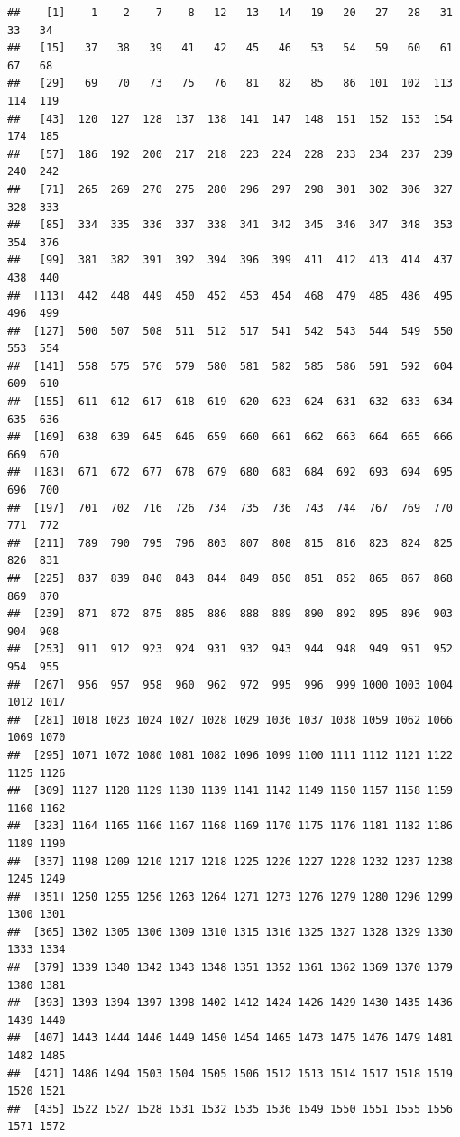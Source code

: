\documentclass[]{article}
\begin{document}
\begin{verbatim}
##    [1]    1    2    7    8   12   13   14   19   20   27   28   31   33   34
##   [15]   37   38   39   41   42   45   46   53   54   59   60   61   67   68
##   [29]   69   70   73   75   76   81   82   85   86  101  102  113  114  119
##   [43]  120  127  128  137  138  141  147  148  151  152  153  154  174  185
##   [57]  186  192  200  217  218  223  224  228  233  234  237  239  240  242
##   [71]  265  269  270  275  280  296  297  298  301  302  306  327  328  333
##   [85]  334  335  336  337  338  341  342  345  346  347  348  353  354  376
##   [99]  381  382  391  392  394  396  399  411  412  413  414  437  438  440
##  [113]  442  448  449  450  452  453  454  468  479  485  486  495  496  499
##  [127]  500  507  508  511  512  517  541  542  543  544  549  550  553  554
##  [141]  558  575  576  579  580  581  582  585  586  591  592  604  609  610
##  [155]  611  612  617  618  619  620  623  624  631  632  633  634  635  636
##  [169]  638  639  645  646  659  660  661  662  663  664  665  666  669  670
##  [183]  671  672  677  678  679  680  683  684  692  693  694  695  696  700
##  [197]  701  702  716  726  734  735  736  743  744  767  769  770  771  772
##  [211]  789  790  795  796  803  807  808  815  816  823  824  825  826  831
##  [225]  837  839  840  843  844  849  850  851  852  865  867  868  869  870
##  [239]  871  872  875  885  886  888  889  890  892  895  896  903  904  908
##  [253]  911  912  923  924  931  932  943  944  948  949  951  952  954  955
##  [267]  956  957  958  960  962  972  995  996  999 1000 1003 1004 1012 1017
##  [281] 1018 1023 1024 1027 1028 1029 1036 1037 1038 1059 1062 1066 1069 1070
##  [295] 1071 1072 1080 1081 1082 1096 1099 1100 1111 1112 1121 1122 1125 1126
##  [309] 1127 1128 1129 1130 1139 1141 1142 1149 1150 1157 1158 1159 1160 1162
##  [323] 1164 1165 1166 1167 1168 1169 1170 1175 1176 1181 1182 1186 1189 1190
##  [337] 1198 1209 1210 1217 1218 1225 1226 1227 1228 1232 1237 1238 1245 1249
##  [351] 1250 1255 1256 1263 1264 1271 1273 1276 1279 1280 1296 1299 1300 1301
##  [365] 1302 1305 1306 1309 1310 1315 1316 1325 1327 1328 1329 1330 1333 1334
##  [379] 1339 1340 1342 1343 1348 1351 1352 1361 1362 1369 1370 1379 1380 1381
##  [393] 1393 1394 1397 1398 1402 1412 1424 1426 1429 1430 1435 1436 1439 1440
##  [407] 1443 1444 1446 1449 1450 1454 1465 1473 1475 1476 1479 1481 1482 1485
##  [421] 1486 1494 1503 1504 1505 1506 1512 1513 1514 1517 1518 1519 1520 1521
##  [435] 1522 1527 1528 1531 1532 1535 1536 1549 1550 1551 1555 1556 1571 1572

\end{verbatim}
\end{document}
